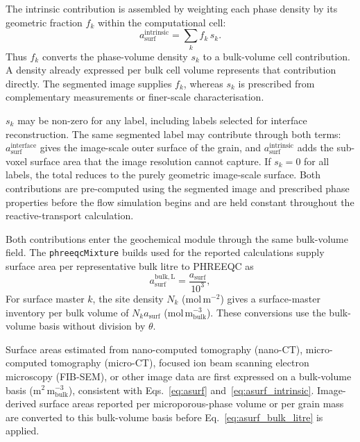 The intrinsic contribution is assembled by weighting each phase density by
its geometric fraction $f_k$ within the computational cell:
\begin{equation}
a_{\mathrm{surf}}^{\mathrm{intrinsic}} = \sum_k f_k\,s_k.
\label{eq:asurf_intrinsic}
\end{equation}
Thus $f_k$ converts the phase-volume density $s_k$ to a bulk-volume cell
contribution. A density already expressed per bulk cell volume represents
that contribution directly. The segmented image supplies $f_k$, whereas
$s_k$ is prescribed from complementary measurements or finer-scale
characterisation.

$s_k$ may be non-zero for any label, including labels selected for interface
reconstruction. The same segmented label may contribute through both terms:
$a_{\mathrm{surf}}^{\mathrm{interface}}$ gives the image-scale outer surface
of the grain, and $a_{\mathrm{surf}}^{\mathrm{intrinsic}}$ adds the
sub-voxel surface area that the image resolution cannot capture. If
$s_k=0$ for all labels, the total reduces to the purely geometric image-scale
surface. Both contributions are pre-computed using the segmented image and
prescribed phase properties before the flow simulation begins and are held
constant throughout the reactive-transport calculation.

Both contributions enter the geochemical module through the same bulk-volume
field. The \texttt{phreeqcMixture} builds used for the reported calculations
supply surface area per representative bulk litre to PHREEQC as
\begin{equation}
a_{\mathrm{surf}}^{\mathrm{bulk,L}} = \frac{a_{\mathrm{surf}}}{10^{3}},
\label{eq:asurf_bulk_litre}
\end{equation}
For surface master $k$, the site density $N_k$ (mol\,m$^{-2}$) gives a
surface-master inventory per bulk volume of $N_k a_{\mathrm{surf}}$
(mol\,m$^{-3}_{\mathrm{bulk}}$). These conversions use the bulk-volume basis
without division by $\theta$.

Surface areas estimated from nano-computed tomography
(nano-CT), micro-computed tomography (micro-CT), focused ion beam scanning
electron microscopy (FIB-SEM), or other image data are first expressed on a
bulk-volume basis (m$^2$\,m$^{-3}_{\mathrm{bulk}}$), consistent with
Eqs.~\eqref{eq:asurf} and~\eqref{eq:asurf_intrinsic}. Image-derived surface areas
reported per microporous-phase volume or per grain mass are converted to this
bulk-volume basis before Eq.~\eqref{eq:asurf_bulk_litre} is applied.

